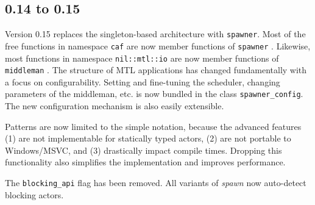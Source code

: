 \clearpage
\subsection{0.14 to 0.15}

Version 0.15 replaces the singleton-based architecture with
\lstinline^spawner^. Most of the free functions in namespace
\lstinline^caf^ are now member functions of \lstinline^spawner^
. Likewise, most functions in namespace \lstinline^nil::mtl::io^
are now member functions of \lstinline^middleman^ . The
structure of MTL applications has changed fundamentally with a focus on
configurability. Setting and fine-tuning the scheduler, changing parameters of
the middleman, etc. is now bundled in the class
\lstinline^spawner_config^. The new configuration mechanism is also easily
extensible.

Patterns are now limited to the simple notation, because the advanced features
(1) are not implementable for statically typed actors, (2) are not portable to
Windows/MSVC, and (3) drastically impact compile times. Dropping this
functionality also simplifies the implementation and improves performance.

The \lstinline^blocking_api^ flag has been removed. All variants of
\emph{spawn} now auto-detect blocking actors.
